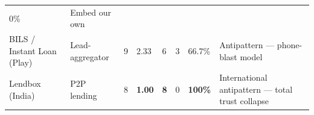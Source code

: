 \documentclass[
  10pt,
]{article}
\begin{document}
\begin{longtable}[]{@{}llllllll@{}}
\begin{minipage}[t]{0.10\columnwidth}
0\%\strut
\end{minipage} & \begin{minipage}[t]{0.10\columnwidth}\raggedright
Embed our own\strut
\end{minipage}\tabularnewline
\begin{minipage}[t]{0.10\columnwidth}\raggedright
BILS / Instant Loan (Play)\strut
\end{minipage} & \begin{minipage}[t]{0.10\columnwidth}\raggedright
Lead-aggregator\strut
\end{minipage} & \begin{minipage}[t]{0.10\columnwidth}\raggedright
9\strut
\end{minipage} & \begin{minipage}[t]{0.10\columnwidth}\raggedright
2.33\strut
\end{minipage} & \begin{minipage}[t]{0.10\columnwidth}\raggedright
6\strut
\end{minipage} & \begin{minipage}[t]{0.10\columnwidth}\raggedright
3\strut
\end{minipage} & \begin{minipage}[t]{0.10\columnwidth}\raggedright
66.7\%\strut
\end{minipage} & \begin{minipage}[t]{0.10\columnwidth}\raggedright
Antipattern --- phone-blast model\strut
\end{minipage}\tabularnewline
\begin{minipage}[t]{0.10\columnwidth}\raggedright
Lendbox (India)\strut
\end{minipage} & \begin{minipage}[t]{0.10\columnwidth}\raggedright
P2P lending\strut
\end{minipage} & \begin{minipage}[t]{0.10\columnwidth}\raggedright
8\strut
\end{minipage} & \begin{minipage}[t]{0.10\columnwidth}\raggedright
\textbf{1.00}\strut
\end{minipage} & \begin{minipage}[t]{0.10\columnwidth}\raggedright
\textbf{8}\strut
\end{minipage} & \begin{minipage}[t]{0.10\columnwidth}\raggedright
0\strut
\end{minipage} & \begin{minipage}[t]{0.10\columnwidth}\raggedright
\textbf{100\%}\strut
\end{minipage} & \begin{minipage}[t]{0.10\columnwidth}\raggedright
International antipattern --- total trust collapse\strut
\end{minipage}\tabularnewline
\bottomrule
\end{longtable}
\end{document}
